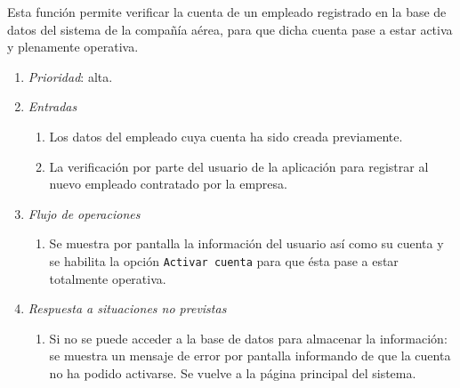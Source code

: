 

	Esta función permite verificar la cuenta de un empleado registrado en la base de datos del sistema de la compañía aérea, para que dicha cuenta pase a estar activa y plenamente operativa.

\begin{enumerate}
	\item \textit{Prioridad}: alta.
	\item \textit{Entradas}
	\begin{enumerate}
		\item Los datos del empleado cuya cuenta ha sido creada previamente.
		\item La verificación por parte del usuario de la aplicación para registrar al nuevo empleado contratado por la empresa.
	\end{enumerate}
	\item \textit{Flujo de operaciones}
	\begin{enumerate}
		\item Se muestra por pantalla la información del usuario así como su cuenta y se habilita la opción \verb|Activar cuenta| para que ésta pase a estar totalmente operativa.
	\end{enumerate}
	\item \textit{Respuesta a situaciones no previstas}
	\begin{enumerate}
		\item Si no se puede acceder a la base de datos para almacenar la información: se muestra un mensaje de error por pantalla informando de que la cuenta no ha podido activarse. Se vuelve a la página principal del sistema.
	\end{enumerate}

\end{enumerate}
